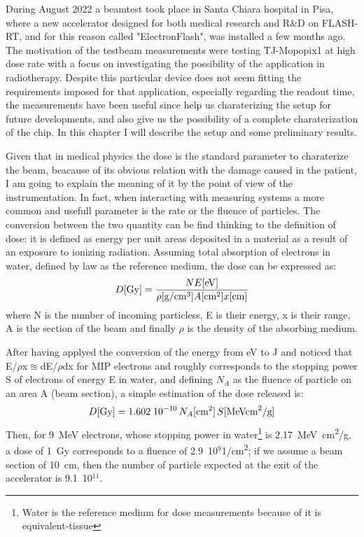 During August 2022 a beamtest took place in Santa Chiara hospital in Pisa, where a new accelerator designed for both medical research and R$\&$D on FLASH-RT, and for this reason called "ElectronFlash", was installed a few months ago. 
The motivation of the testbeam measurements were testing TJ-Mopopix1 at high dose rate with a focus on investigating the possibility of the application in radiotherapy. Despite this particular device does not seem fitting the requirements imposed for that application, especially regarding the readout time, the measurements have been useful since help us charaterizing the setup for future developments, and also give us the possibility of a complete charaterization of the chip.
In this chapter I will describe the setup and some preliminary results.  


Given that in medical physics the dose is the standard parameter to charaterize the beam, beacause of its obvious relation with the damage caused in the patient, I am going to explain the meaning of it by the point of view of the instrumentation.
In fact, when interacting with measuring systems a more common and usefull parameter is the rate or the fluence of particles.
The conversion between the two quantity can be find thinking to the definition of dose: it is defined as energy per unit areas deposited in a material as a result of an exposure to ionizing radiation. 
Assuming total absorption of electrons in water, defined by law as the reference medium, the dose can be expressed as: 
\begin{equation}
   D[\si{Gy}] = \frac{N E[\si{eV}]}{\rho[\si{g/cm}^3] A[\si{cm\squared}] x[\si{cm}]}
\end{equation} 
where N is the number of incoming particless, E is their energy,  x is their range, A is the section of the beam and finally $\rho$ is the density of the absorbing medium.  

After having applyed the conversion of the energy from \si{eV} to \si{J} and noticed that E/$\rho$x$\approxeq$dE/$\rho$dx for MIP electrons and roughly corresponds to the stopping power S of electrons of energy E in water, and defining $N_{A}$ as the fluence of particle on an area A (beam section), a simple estimation of the dose released is:
\begin{equation}
   D[\si{Gy}] = 1.602\;10^{-10}\,N_{A}[\si{cm\squared}]\,S[\si{MeV cm\squared /g}]
\end{equation}\label{eq:DOSE_N_counts}
Then, for \SI{9}{MeV} electrons, whose stopping power in water\footnote{Water is the reference medium for dose measurements because of it is equivalent-tissue} is \SI{2.17}{MeV cm\squared/g}, a dose of \SI{1}{Gy} corresponds to a fluence of 2.9~10$^{9}$\si{1/cm\squared}; if we assume a beam section of \SI{10}{cm}, then the number of particle expected at the exit of the accelerator is 9.1~10$^{11}$.

